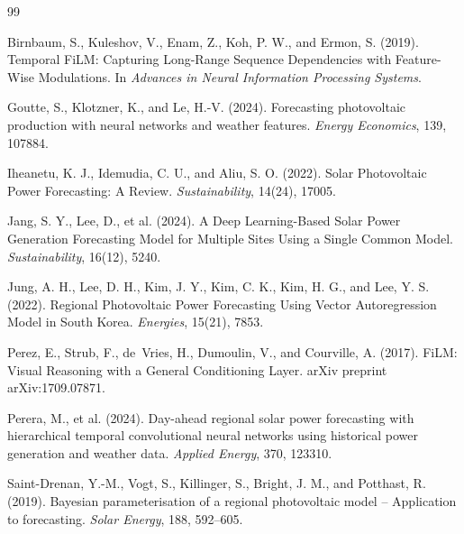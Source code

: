 \documentclass[11pt,a4paper]{article}
\begin{document}
\begin{thebibliography}{99}

Birnbaum, S., Kuleshov, V., Enam, Z., Koh, P. W., and Ermon, S. (2019).
\newblock Temporal FiLM: Capturing Long-Range Sequence Dependencies with Feature-Wise Modulations.
\newblock In \emph{Advances in Neural Information Processing Systems}.

Goutte, S., Klotzner, K., and Le, H.-V. (2024).
\newblock Forecasting photovoltaic production with neural networks and weather features.
\newblock \emph{Energy Economics}, 139, 107884.

Iheanetu, K. J., Idemudia, C. U., and Aliu, S. O. (2022).
\newblock Solar Photovoltaic Power Forecasting: A Review.
\newblock \emph{Sustainability}, 14(24), 17005.

Jang, S. Y., Lee, D., et al. (2024).
\newblock A Deep Learning-Based Solar Power Generation Forecasting Model for Multiple Sites Using a Single Common Model.
\newblock \emph{Sustainability}, 16(12), 5240.

Jung, A. H., Lee, D. H., Kim, J. Y., Kim, C. K., Kim, H. G., and Lee, Y. S. (2022).
\newblock Regional Photovoltaic Power Forecasting Using Vector Autoregression Model in South Korea.
\newblock \emph{Energies}, 15(21), 7853.

Perez, E., Strub, F., de~Vries, H., Dumoulin, V., and Courville, A. (2017).
\newblock FiLM: Visual Reasoning with a General Conditioning Layer.
\newblock arXiv preprint arXiv:1709.07871.

Perera, M., et al. (2024).
\newblock Day-ahead regional solar power forecasting with hierarchical temporal convolutional neural networks using historical power generation and weather data.
\newblock \emph{Applied Energy}, 370, 123310.

Saint-Drenan, Y.-M., Vogt, S., Killinger, S., Bright, J. M., and Potthast, R. (2019).
\newblock Bayesian parameterisation of a regional photovoltaic model -- Application to forecasting.
\newblock \emph{Solar Energy}, 188, 592--605.


\end{thebibliography}
\end{document}
